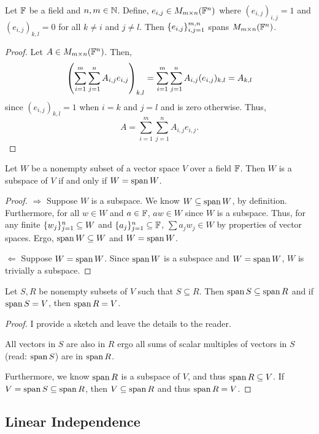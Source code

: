 \begin{example}
	Let $\mathbb{F}$ be a field and $n,m\in\mathbb{N}$.
	Define, $e_{i,j}\in M_{m\times n}(\mathbb{F}^n)$ where $(e_{i,j})_{i,j}=1$ and $(e_{i,j})_{k,l}=0$ for all $k\neq i$ and $j\neq l$.
	Then $\lbrace e_{i,j} \rbrace_{i,j=1}^{m,n}$ spans $M_{m\times n}(\mathbb{F}^n)$.
\end{example}
\begin{proof}
	Let $A\in M_{m\times n}(\mathbb{F}^n)$.
	Then,
	\[
		\left( \sum_{i=1}^m\sum_{j=1}^n A_{i,j} e_{i,j} \right)_{k,l}=\sum_{i=1}^m\sum_{j=1}^n A_{i,j} (e_{i,j})_{k,l}=A_{k,l}
	\]
	since $(e_{i,j})_{k,l}=1$ when $i=k$ and $j=l$ and is zero otherwise.
	Thus,
	\[
		A=\sum_{i=1}^m\sum_{j=1}^n A_{i,j} e_{i,j}.
	\]
\end{proof}

\begin{proposition}
	Let $W$ be a nonempty subset of a vector space $V$ over a field $\mathbb{F}$.
	Then $W$ is a subspace of $V$ if and only if $W=\operatorname{span} W$.
\end{proposition}
\begin{proof}
	$\Rightarrow$ Suppose $W$ is a subspace.
	We know $W\subseteq\operatorname{span} W$, by definition.
	Furthermore, for all $w\in W$ and $a\in\mathbb{F}$, $aw\in W$ since $W$ is a subspace.
	Thus, for any finite $\lbrace w_j \rbrace_{j=1}^n\subseteq W$ and $\lbrace a_j \rbrace_{j=1}^n\subseteq\mathbb{F}$, $\sum a_jw_j\in W$ by properties of vector spaces.
	Ergo, $\operatorname{span} W\subseteq W$ and $W=\operatorname{span} W$.

	$\Leftarrow$ Suppose $W=\operatorname{span} W$.
	Since $\operatorname{span} W$ is a subspace and $W=\operatorname{span} W$, $W$ is trivially a subspace.
\end{proof}

\begin{proposition}
	Let $S,R$ be nonempty subsets of $V$ such that $S\subseteq R$.
	Then $\operatorname{span} S\subseteq \operatorname{span} R$ and if $\operatorname{span} S=V$, then $\operatorname{span} R=V$.
\end{proposition}
\begin{proof}
	I provide a sketch and leave the details to the reader.

	All vectors in $S$ are also in $R$ ergo all sums of scalar multiples of vectors in $S$ (read: $\operatorname{span} S$) are in $\operatorname{span} R$.

	Furthermore, we know $\operatorname{span} R$ is a subspace of $V$, and thus $\operatorname{span} R\subseteq V$.
	If $V=\operatorname{span} S\subseteq \operatorname{span} R$, then $V\subseteq \operatorname{span} R$ and thus $\operatorname{span} R=V$.
\end{proof}

\pagebreak

\subsection{Linear Independence}

